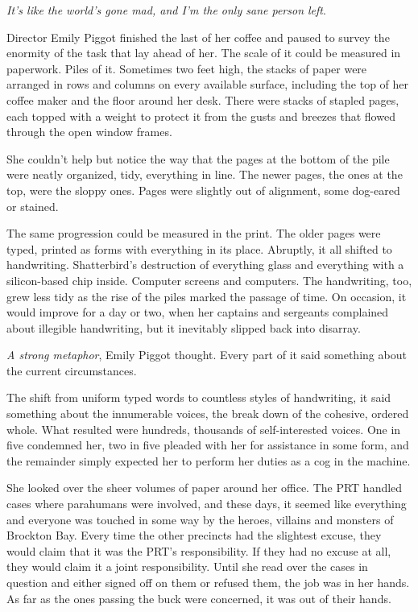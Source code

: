 





\emph{It's like the world's gone mad, and I'm the only sane person left}.



Director Emily Piggot finished the last of her coffee and paused to survey the enormity of the task that lay ahead of her.  The scale of it could be measured in paperwork.  Piles of it.  Sometimes two feet high, the stacks of paper were arranged in rows and columns on every available surface, including the top of her coffee maker and the floor around her desk.  There were stacks of stapled pages, each topped with a weight to protect it from the gusts and breezes that flowed through the open window frames.



She couldn't help but notice the way that the pages at the bottom of the pile were neatly organized, tidy, everything in line.  The newer pages, the ones at the top, were the sloppy ones.  Pages were slightly out of alignment, some dog-eared or stained.



The same progression could be measured in the print.  The older pages were typed, printed as forms with everything in its place.  Abruptly, it all shifted to handwriting.  Shatterbird's destruction of everything glass and everything with a silicon-based chip inside.  Computer screens and computers.  The handwriting, too, grew less tidy as the rise of the piles marked the passage of time.  On occasion, it would improve for a day or two, when her captains and sergeants complained about illegible handwriting, but it inevitably slipped back into disarray.



\emph{A strong metaphor}, Emily Piggot thought.  Every part of it said something about the current circumstances.



The shift from uniform typed words to countless styles of handwriting, it said something about the innumerable voices, the break down of the cohesive, ordered whole.  What resulted were hundreds, thousands of self-interested voices.  One in five condemned her, two in five pleaded with her for assistance in some form, and the remainder simply expected her to perform her duties as a cog in the machine.



She looked over the sheer volumes of paper around her office.  The PRT handled cases where parahumans were involved, and these days, it seemed like everything and everyone was touched in some way by the heroes, villains and monsters of Brockton Bay.  Every time the other precincts had the slightest excuse, they would claim that it was the PRT's responsibility.  If they had no excuse at all, they would claim it a joint responsibility.  Until she read over the cases in question and either signed off on them or refused them, the job was in her hands.  As far as the ones passing the buck were concerned, it was out of their hands.



